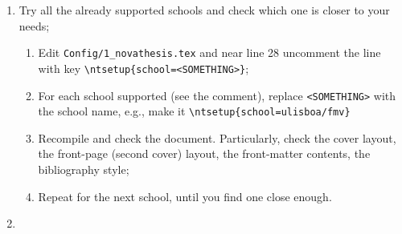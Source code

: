 \begin{enumerate}
  \item Try all the already supported schools and check which one is closer to your needs;
  \begin{enumerate}
    \item Edit \verb!Config/1_novathesis.tex! and near line 28 uncomment the line with key \verb!\ntsetup{school=<SOMETHING>}!;
    \item For each school supported (see the comment), replace \verb!<SOMETHING>! with the school name, e.g., make it \verb!\ntsetup{school=ulisboa/fmv}!
    \item Recompile and check the document.  Particularly, check the cover layout, the front-page (second cover) layout, the front-matter contents, the bibliography style;
    \item Repeat for the next school, until you find one close enough.
  \end{enumerate}
  \item 
\end{enumerate}